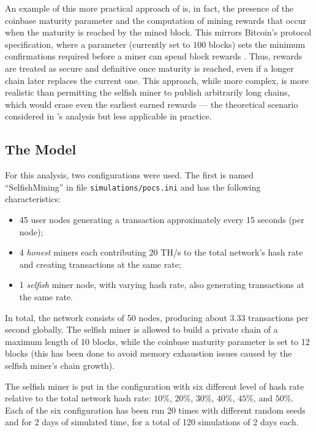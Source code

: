 An example of this more practical approach of \iblock{} is, in fact, the
presence of the coinbase maturity parameter and the computation of mining
rewards that occur when the maturity is reached by the mined block. This
mirrors Bitcoin's protocol specification, where a 
parameter (currently set to \(100\) blocks) sets the minimum confirmations
required before a miner can spend block rewards \cite[Chapter~``Coinbase
Transaction'']{learnmeabitcoin}. Thus, rewards are treated as secure and
definitive once maturity is reached, even if a longer chain later replaces the
current one. This approach, while more complex, is more realistic than
permitting the selfish miner to publish arbitrarily long chains, which would
erase even the earliest earned rewards --- the theoretical scenario considered
in \citeauthor{selfish-mining}'s analysis but less applicable in practice.

\subsection{The Model}\label{subsec:selfish-model}

For this analysis, two configurations were used. The first is named
``SelfishMining'' in file \texttt{simulations/pocs.ini} and has the following
characteristics:
\begin{itemize}
	\item 45 user nodes generating a transaction approximately every 15
		seconds (per node);
	\item 4 \emph{honest} miners each contributing 20 TH/s to the total
		network's hash rate and creating transactions at the same rate;
	\item 1 \emph{selfish} miner node, with varying hash rate, also
		generating transactions at the same rate.
\end{itemize}

In total, the network consists of 50 nodes, producing about \(3.33\)
transactions per second globally. The selfish miner is allowed to build a
private chain of a maximum length of 10 blocks, while the coinbase maturity
parameter is set to 12 blocks (this has been done to avoid memory exhaustion
issues caused by the selfish miner's chain growth).

The selfish miner is put in the configuration with six different level of
hash rate relative to the total network hash rate: \(10\%\), \(20\%\),
\(30\%\), \(40\%\), \(45\%\), and \(50\%\). Each of the six configuration has
been run 20 times with different random seeds and for 2 days of simulated time,
for a total of 120 simulations of 2 days each.

